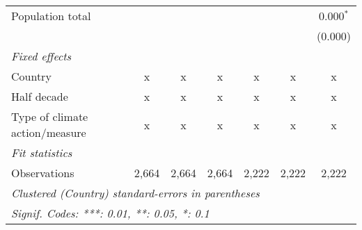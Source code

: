 \begin{tabular}{lcccccc}
   Population total                         &         &               &               &               &               & 0.000$^{*}$\\   
                                            &         &               &               &               &               & (0.000)\\   
   \emph{Fixed effects}\\
   Country                                  & x       & x             & x             & x             & x             & x\\  
   Half decade                              & x       & x             & x             & x             & x             & x\\  
   Type of climate action/measure           & x       & x             & x             & x             & x             & x\\  
   \midrule \emph{Fit statistics}\\
   Observations                             & 2,664   & 2,664         & 2,664         & 2,222         & 2,222         & 2,222\\  
   \midrule
   \multicolumn{7}{l}{\emph{Clustered (Country) standard-errors in parentheses}}\\
   \multicolumn{7}{l}{\emph{Signif. Codes: ***: 0.01, **: 0.05, *: 0.1}}\\
\end{tabular}
\par\endgroup


